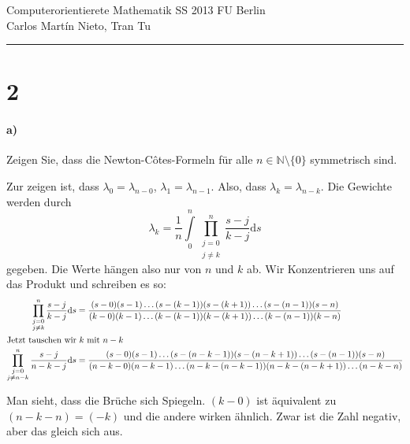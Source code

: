 \documentclass[ngerman,a4paper]{scrartcl}
\newcommand{\N}{\ensuremath{\mathbb{N}}}
\begin{document}
{\sffamily
  \hfill
  Computerorientierete Mathematik SS 2013\hfill
  FU Berlin\\[8pt]
  \hfill Carlos Martín Nieto, Tran Tu\hrule \bigskip
}

\section*{2}

\paragraph{a)}

Zeigen Sie, dass die Newton-Côtes-Formeln für alle
$n\in\N\setminus\{0\}$ symmetrisch sind.

Zur zeigen ist, dass $\lambda_0 = \lambda_{n-0}$, $\lambda_1 =
\lambda_{n-1}$. Also, dass $\lambda_k = \lambda_{n-k}$. Die Gewichte
werden durch
\[
\lambda_k = \frac{1}{n} \int\limits^n_0\prod^n_{\substack{j=0\\j\neq k}} \frac{s-j}{k-j}\text{d}s
\]
gegeben. Die Werte hängen also nur von $n$ und $k$ ab. Wir
Konzentrieren uns auf das Produkt und schreiben es so:
\begin{align*}
  \prod^n_{\substack{j=0\\j\neq k}} \frac{s-j}{k-j}\text{d}s &= \frac{(s-0)(s-1)\dots(s-(k-1))(s-(k+1))\dots(s-(n-1))(s-n)}
  {(k-0)(k-1)\dots(k-(k-1))(k-(k+1))\dots(k-(n-1))(k-n)}\\
  \intertext{Jetzt tauschen wir $k$ mit $n-k$}
  \prod^n_{\substack{j=0\\j\neq n-k}} \frac{s-j}{n-k-j}\text{d}s &= \frac{(s-0)(s-1)\dots(s-(n-k-1))(s-(n-k+1))\dots(s-(n-1))(s-n)}
  {(n-k-0)(n-k-1)\dots(n-k-(n-k-1))(n-k-(n-k+1))\dots(n-k-n)}
\end{align*}

Man sieht, dass die Brüche sich Spiegeln. $(k-0)$ ist äquivalent zu
$(n-k-n)=(-k)$ und die andere wirken ähnlich. Zwar ist die Zahl
negativ, aber das gleich sich aus.
\end{document}
